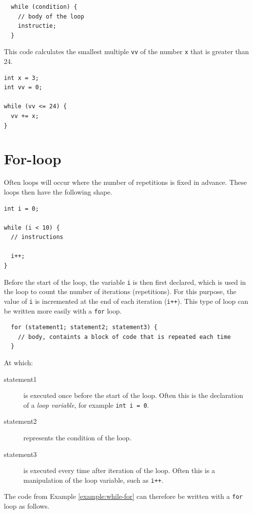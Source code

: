 \documentclass[11pt,fleqn]{book} %
\begin{document}
\begin{definition}[While]
	\phantom{ }
	\begin{verbatim}
  while (condition) {
    // body of the loop
    instructie;
  }
	\end{verbatim}
	\vspace{0cm}
\end{definition}

\begin{example}[While]
    This code calculates the smallest multiple \texttt{vv} of the number \texttt{x} that is greater than 24.
	\begin{verbatim}
int x = 3;
int vv = 0;

while (vv <= 24) {
  vv += x;
}
	\end{verbatim}
\end{example}

\section{For-loop}
Often loops will occur where the number of repetitions is fixed in advance. These loops then have the following shape.

\begin{example}
	\label{example:while-for}
	\phantom{ }
	\begin{verbatim}
int i = 0;

while (i < 10) {
  // instructions

  i++;
}
	\end{verbatim}
\end{example}

\noindent
Before the start of the loop, the variable \texttt{i} is then first declared, which is used in the loop to count the number of iterations (repetitions). For this purpose, the value of \texttt{i} is incremented at the end of each iteration (\texttt{i++}). This type of loop can be written more easily with a \texttt{for} loop.

\begin{definition}[For]
	\phantom{ }
	\begin{verbatim}
  for (statement1; statement2; statement3) {
    // body, containts a block of code that is repeated each time
  }
	\end{verbatim}
	At which:
	\begin{description}
        \item[statement1] is executed once before the start of the loop. Often this is the declaration of a \emph{loop variable}, for example \texttt{int i = 0}.
		\item[statement2] represents the condition of the loop.
		\item[statement3] is executed every time after iteration of the loop. Often this is a manipulation of the loop variable, such as \texttt{i++}.
	\end{description}
\end{definition}
\noindent
The code from Example \ref{example:while-for} can therefore be written with a \texttt{for} loop as follows.
\end{document}
